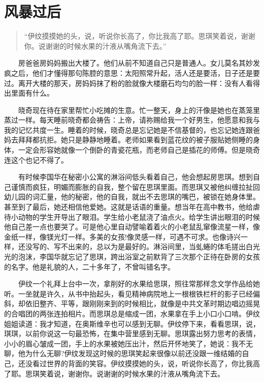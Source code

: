 \documentclass[12pt,UTF8]{ctexbook}
\begin{document}
\hypertarget{ux98ceux66b4ux8fc7ux540e}{%
\section*{风暴过后}\label{ux98ceux66b4ux8fc7ux540e}}

\begin{quote}
\enquote{伊纹摸摸她的头，说，听说你长高了，你比我高了耶。思琪笑着说，谢谢你。说谢谢的时候水果的汁液从嘴角流下去。}
\end{quote}

　　房爸爸房妈妈搬出大楼了。他们从前不知道自己只是普通人。女儿莫名其妙发疯之后，他们才懂得那句陈腔的意思：太阳照常升起，活人还是要活，日子还是要过。离开大楼的那天，房妈妈抹了粉的脸就像大楼磨石均匀的脸一样：没有人看得出里面有什么。

　　晓奇现在待在家里帮忙小吃摊的生意。忙一整天，身上的汗像是她也在蒸笼里蒸过一样。每天睡前晓奇都会祷告：上帝，请祢赐给我一个好男生，他愿意和我与我的记忆共度一生。睡着的时候，晓奇总是忘记她是不信基督的，也忘记她连跟爸妈去拜拜都抗拒。她只是静静地睡着。老师如果看到蓝花纹的被子服贴她侧睡的身体，一定会形容她就像一个倒卧的青瓷花瓶，而老师自己是插花的师傅。但是晓奇连这个也记不得了。

　　有时候李国华在秘密小公寓的淋浴间低头看着自己，他会想起房思琪。想到自己谨慎而疯狂，明媚而膨胀的自我，整个留在思琪里面。而思琪又被他纠缠拉扯回幼儿园的词汇量，他的秘密，他的自我，就出不去思琪的嘴巴，被锁在她身体里。甚至到了最后，她还相信他爱她。这就是话语的重量。想当年在高中教书，他给虐待小动物的学生开导出了眼泪。学生给小老鼠浇了油点火。给学生讲出眼泪的时候他自己差一点也要哭了。可是他心里自动譬喻着着火的小老鼠乱窜像流星一样，像金纸一样，像镁光灯一样。多美的女孩!像灵感一样，可遇不可求。也像诗兴一样，还没写的、写不出来的，总以为是最好的。淋浴间里，当虬蜷的体毛搓出白光光的泡沫，李国华就忘记了思琪，跨出浴室之前默背了三次那个正待在卧房的女孩的名字。他是礼貌的人，二十多年了，不曾叫错名字。

　　伊纹一个礼拜上台中一次，拿削好的水果给思琪，照往常那样念文学作品给她听。一坐就是许久，从书中抬起头，看见精神病院地上一根根铁栏杆的影子已经偏斜，却依旧整齐、平等，跟刚刚来到的时候相比，就像是中共文革时期边唱边摇晃的合唱团的两张连拍相片。而思琪总是缩成一团，水果拿在手上小口小口啃。伊纹姐姐读道：我才知道，在奥斯维辛也可以感到无聊。伊纹停下来，看看思琪，说，琪琪，以前你说这一句最恐怖，在集中营里感到无聊。思琪露出努力思考的表情，小小的眉心皱成一团，手上的水果被她压出汁，然后开怀地笑了，她说：我不无聊，他为什么无聊?伊纹发现这时候的思琪笑起来很像以前还没跟一维结婚的自己，还没看过世界的背面的笑容。伊纹摸摸她的头，说，听说你长高了，你比我高了耶。思琪笑着说，谢谢你。说谢谢的时候水果的汁液从嘴角流下去。
\end{document}
